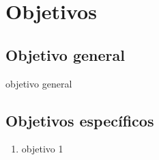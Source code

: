 \section{Objetivos}

\subsection{Objetivo general}

objetivo general

\subsection{Objetivos específicos}

\begin{enumerate}
    \item objetivo 1

\end{enumerate}
